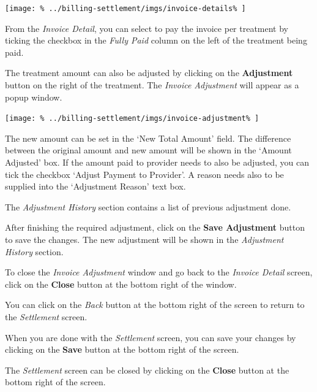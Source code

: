 \documentclass[../main/main]{subfiles}
\begin{document}
\texttt{[image: \%
  ../billing-settlement/imgs/invoice-details\%
]}

From the \emph{Invoice Detail}, you can select to pay the invoice
per treatment by ticking the checkbox in the \emph{Fully Paid} column on
the left of the treatment being paid.

The treatment amount can also be adjusted by clicking on the
\textbf{Adjustment} button on the right of the treatment. The
\emph{Invoice Adjustment} will appear as a popup window.

\texttt{[image: \%
  ../billing-settlement/imgs/invoice-adjustment\%
]}

The new amount can be set in the `New Total Amount' field. The difference
between the original amount and new amount will be shown in the `Amount
Adjusted' box. If the amount paid to provider needs to also be adjusted,
you can tick the checkbox `Adjust Payment to Provider'. A reason needs also
to be supplied into the `Adjustment Reason' text box.

The \emph{Adjustment History} section contains a list of previous adjustment
done.

After finishing the required adjustment, click on the \textbf{Save Adjustment}
button to save the changes. The new adjustment will be shown in the
\emph{Adjustment History} section.

To close the \emph{Invoice Adjustment} window and go back to the
\emph{Invoice Detail} screen, click on the \textbf{Close} button at the bottom
right of the window.

You can click on the \emph{Back} button at the bottom right of the screen to
return to the \emph{Settlement} screen.

When you are done with the \emph{Settlement} screen, you can save your changes
by clicking on the \textbf{Save} button at the bottom right of the screen.

The \emph{Settlement} screen can be closed by clicking on the
\textbf{Close} button at the bottom right of the screen.
\end{document}
